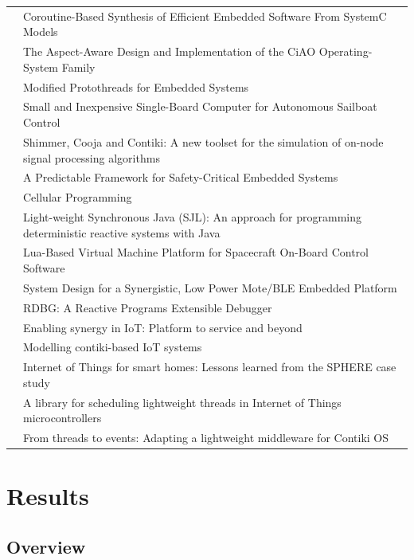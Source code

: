 \documentclass[format=acmsmall, review=false, screen=false]{acmart}
\begin{document}
\begin{longtable}[c]{ l p{8cm} }
\cite{Liu2011} & Coroutine-Based Synthesis of Efficient Embedded Software From SystemC Models \\
\cite{Lohmann2012} & The Aspect-Aware Design and Implementation of the CiAO Operating-System Family \\
\cite{Schimpf2012b} & Modified Protothreads for Embedded Systems \\
\cite{Alvira2013} & Small and Inexpensive Single-Board Computer for Autonomous Sailboat Control \\
\cite{Kugler2013} & Shimmer, Cooja and Contiki: A new toolset for the simulation of on-node signal processing algorithms \\
\cite{Andalam2014} & A Predictable Framework for Safety-Critical Embedded Systems \\
\cite{Niebert2014} & Cellular Programming \\
\cite{Motika2015} & Light-weight Synchronous Java (SJL): An approach for programming deterministic reactive systems with Java \\
\cite{Park2015} & Lua-Based Virtual Machine Platform for Spacecraft On-Board Control Software \\
\cite{Andersen2016} & System Design for a Synergistic, Low Power Mote/BLE Embedded Platform \\
\cite{Jahier2016} & RDBG: A Reactive Programs Extensible Debugger \\
\cite{Andersen2017b} & Enabling synergy in IoT: Platform to service and beyond \\
\cite{Durmaz2017} & Modelling contiki-based IoT systems \\
\cite{Elsts2017} & Internet of Things for smart homes: Lessons learned from the SPHERE case study \\
\cite{Kalebe2017} & A library for scheduling lightweight threads in Internet of Things microcontrollers \\
\cite{Noman2017} & From threads to events: Adapting a lightweight middleware for Contiki OS \\
\hline
\end{longtable}

\fi

\section{Results}
\label{section:results}

\subsection{Overview}
\end{document}
